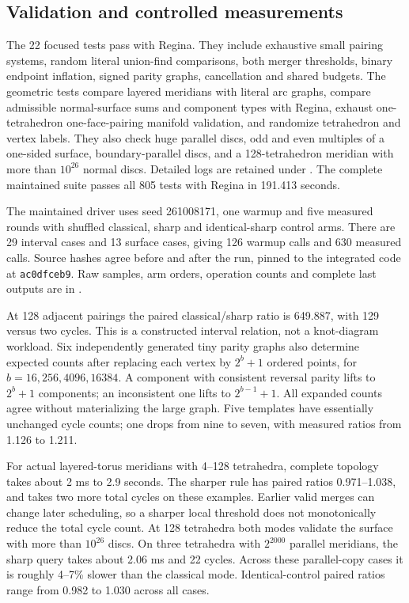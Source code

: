 \subsection{Validation and controlled measurements}

The 22 focused tests pass with Regina. They include exhaustive small
pairing systems, random literal union-find comparisons, both merger
thresholds, binary endpoint inflation, signed parity graphs, cancellation
and shared budgets. The geometric tests compare layered meridians with
literal arc graphs, compare admissible normal-surface sums and component
types with Regina, exhaust one-tetrahedron one-face-pairing manifold
validation, and randomize tetrahedron and vertex labels. They also check
huge parallel discs, odd and even multiples of a one-sided surface,
boundary-parallel discs, and a 128-tetrahedron meridian with more than
$10^{26}$ normal discs. Detailed logs are retained under
. The complete maintained suite passes all 805
tests with Regina in 191.413 seconds.



The maintained driver  uses seed 261008171,
one warmup and five measured rounds with shuffled classical, sharp and
identical-sharp control arms. There are 29 interval cases and 13 surface
cases, giving 126 warmup calls and 630 measured calls. Source hashes agree
before and after the run, pinned to the integrated code at \texttt{ac0dfceb9}.
Raw samples, arm orders, operation counts and complete last outputs are in
.

At 128 adjacent pairings the paired classical/sharp ratio is 649.887,
with 129 versus two cycles. This is a constructed interval relation,
not a knot-diagram workload. Six independently generated tiny parity
graphs also determine expected counts after replacing each vertex by
$2^b+1$ ordered points, for $b=16,256,4096,16384$. A component with
consistent reversal parity lifts to $2^b+1$ components; an inconsistent
one lifts to $2^{b-1}+1$. All expanded counts agree without materializing
the large graph. Five templates have essentially unchanged cycle counts;
one drops from nine to seven, with measured ratios from 1.126 to 1.211.

For actual layered-torus meridians with 4--128 tetrahedra, complete topology
takes about 2 ms to 2.9 seconds. The sharper rule has paired ratios
0.971--1.038, and takes two more total cycles on these examples. Earlier
valid merges can change later scheduling, so a sharper local threshold
does not monotonically reduce the total cycle count. At 128 tetrahedra
both modes validate the surface with more than $10^{26}$ discs. On three
tetrahedra with $2^{2000}$ parallel meridians, the sharp query takes about
2.06 ms and 22 cycles. Across these parallel-copy cases it is roughly
4--7\% slower than the classical mode. Identical-control paired ratios
range from 0.982 to 1.030 across all cases.

